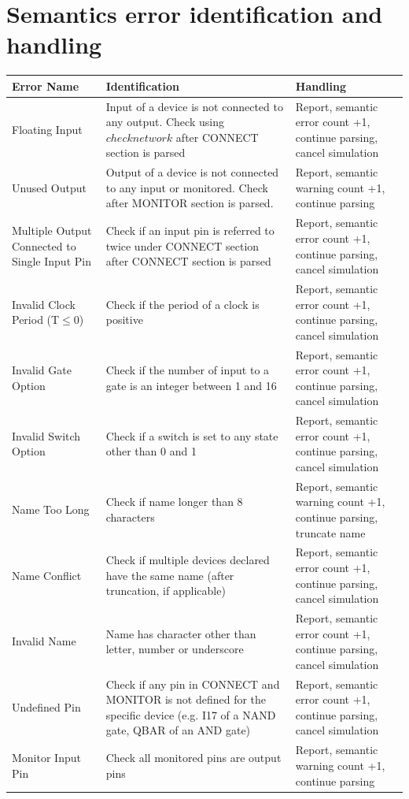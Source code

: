 \documentclass[12pt]{article}
\begin{document}
\section{Semantics error identification and handling}
\begin{center}
	\begin{tabular}{|m{3cm} | m{6cm} | m{6cm} |}
		\hline
		Error Name & Identification & Handling \\
		\hline
		Floating Input & Input of a device is not connected to any output. Check using $checknetwork$ after CONNECT section is parsed & Report, semantic error count +1, continue parsing,  cancel simulation \\
		\hline
		Unused Output & Output of a device is not connected to any input or monitored. Check after MONITOR section is parsed. & Report, semantic warning count +1, continue parsing \\
		\hline
		Multiple Output Connected to Single Input Pin & Check if an input pin is referred to twice under CONNECT section after CONNECT section is parsed & Report, semantic error count +1, continue parsing,  cancel simulation \\
		\hline
		Invalid Clock Period (T$\leq$0) & Check if the period of a clock is positive & Report, semantic error count +1, continue parsing,  cancel simulation \\
		\hline
		Invalid Gate Option & Check if the number of input to a gate is an integer between 1 and 16 & Report, semantic error count +1, continue parsing,  cancel simulation \\
		\hline
		Invalid Switch Option & Check if a switch is set to any state other than 0 and 1 & Report, semantic error count +1, continue parsing,  cancel simulation \\
		\hline
		Name Too Long & Check if name longer than 8 characters & Report, semantic warning count +1, continue parsing, truncate name \\
		\hline
		Name Conflict & Check if multiple devices declared have the same name (after truncation, if applicable) & Report, semantic error count +1, continue parsing, cancel simulation \\
		\hline
		Invalid Name & Name has character other than letter, number or underscore & Report, semantic error count +1, continue parsing, cancel simulation \\
		\hline
		Undefined Pin & Check if any pin in CONNECT and MONITOR is not defined for the specific device (e.g. I17 of a NAND gate, QBAR of an AND gate) & Report, semantic error count +1, continue parsing,  cancel simulation \\
		\hline
		Monitor Input Pin & Check all monitored pins are output pins & Report, semantic warning count +1, continue parsing \\
		\hline
		
		
		
	\end{tabular}
\end{center}
\newpage
\end{document}
